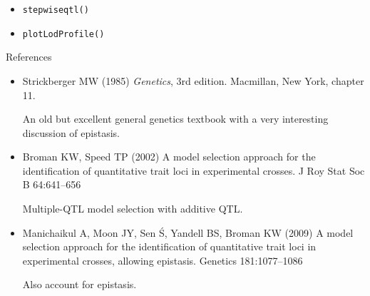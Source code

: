 \documentclass[12pt]{article}
\newcommand{\headsize}{\fontsize{35}{35} \selectfont}
\newcommand{\smallsize}{\fontsize{25}{30} \selectfont}
\newcommand{\smallestsize}{\fontsize{18}{22} \selectfont}
\begin{document}
\vspace{3cm}

\color{mywhite} \smallsize

\hfill \begin{minipage}[t]{9.5in}
\begin{itemize}
\itemsep24pt
\item \verb|stepwiseqtl()|
\item \verb|plotLodProfile()|
\end{itemize} \end{minipage}





\newpage

\headsize \color{myyellow}
\hfill \begin{minipage}{5.75in}
\centering
References
\end{minipage}

\vspace*{15mm}

\color{mywhite} \smallestsize

\hspace*{0.5in}
\begin{minipage}{9.5in}
\begin{itemize}
\itemsep8pt
\item Strickberger MW (1985) \emph{Genetics}, 3rd edition.  Macmillan,
New York, chapter 11.

{\color{myblue} An old but excellent general genetics textbook with a very
interesting discussion of epistasis.}


\item Broman KW, Speed TP (2002) A model selection approach for the
  identification of quantitative trait loci in experimental crosses. J
  Roy Stat Soc B 64:641--656

{\color{myblue} Multiple-QTL model selection with additive QTL.}

\item Manichaikul A, Moon JY, Sen \'S, Yandell BS, Broman KW (2009) A
  model selection approach for the identification of quantitative
  trait loci in experimental crosses, allowing epistasis. Genetics
  181:1077--1086

{\color{myblue} Also account for epistasis.}

\end{itemize}
\end{minipage}
\end{document}
